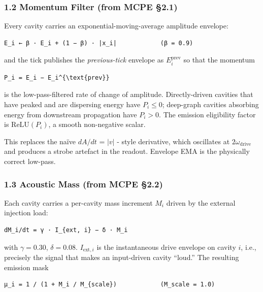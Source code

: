 \documentclass[
  11pt,
  a4paper,
]{article}
\begin{document}
\subsubsection{1.2 Momentum Filter (from MCPE
§2.1)}\label{momentum-filter-from-mcpe-2.1}

Every cavity carries an exponential-moving-average amplitude envelope:

\begin{verbatim}
E_i ← β · E_i + (1 − β) · |x_i|            (β = 0.9)
\end{verbatim}

and the tick publishes the \emph{previous-tick} envelope as
\(E_i^{\text{prev}}\) so that the momentum

\begin{verbatim}
P_i = E_i − E_i^{\text{prev}}
\end{verbatim}

is the low-pass-filtered rate of change of amplitude. Directly-driven
cavities that have peaked and are dispersing energy have \(P_i \le 0\);
deep-graph cavities absorbing energy from downstream propagation have
\(P_i > 0\). The emission eligibility factor is \(\text{ReLU}(P_i)\), a
smooth non-negative scalar.

This replaces the naïve \(dA/dt\) = \(|v|\) - style derivative, which
oscillates at \(2\omega_{\text{drive}}\) and produces a strobe artefact
in the readout. Envelope EMA is the physically correct low-pass.

\subsubsection{1.3 Acoustic Mass (from MCPE
§2.2)}\label{acoustic-mass-from-mcpe-2.2}

Each cavity carries a per-cavity mass increment \(M_i\) driven by the
external injection load:

\begin{verbatim}
dM_i/dt = γ · I_{ext, i} − δ · M_i
\end{verbatim}

with \(\gamma = 0.30\), \(\delta = 0.08\). \(I_{\text{ext}, i}\) is the
instantaneous drive envelope on cavity \(i\), i.e., precisely the signal
that makes an input-driven cavity ``loud.'' The resulting emission mask

\begin{verbatim}
μ_i = 1 / (1 + M_i / M_{scale})            (M_scale = 1.0)
\end{verbatim}
\end{document}
